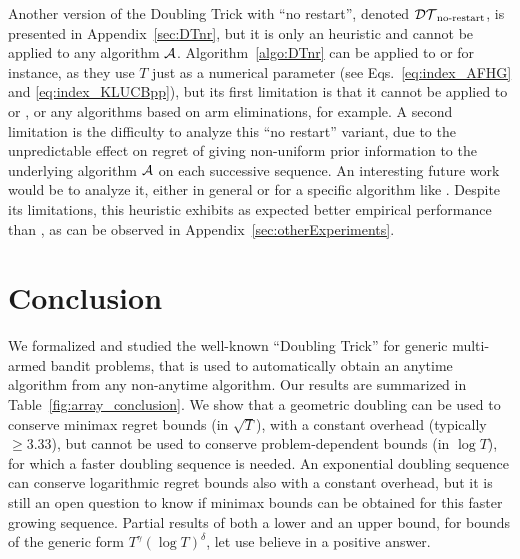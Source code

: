 \documentclass[12pt]{colt2018} %
\begin{document}


Another version of the Doubling Trick with ``no restart'', denoted $\mathcal{DT}_{\text{no-restart}}$, is presented in Appendix~\ref{sec:DTnr}, but it is only an heuristic and cannot be applied to any algorithm $\mathcal{A}$.
Algorithm~\ref{algo:DTnr} can be applied to \KLUCBpp{} or \AFHG{} for instance, as they use $T$ just as a numerical parameter (see Eqs.~\ref{eq:index_AFHG} and \ref{eq:index_KLUCBpp}), but its first limitation is that it cannot be applied to \DMEDp{} \citep{Honda10} or \Exppp{} \citep{Seldin17}, or any algorithms based on arm eliminations, for example.
%
A second limitation is the difficulty to analyze this ``no restart'' variant,
due to the unpredictable effect on regret of giving non-uniform prior information to the underlying algorithm $\mathcal{A}$ on each successive sequence.
An interesting future work would be to analyze it, either in general or for a specific algorithm like \KLUCBpp.
%
Despite its limitations, this heuristic exhibits as expected better empirical performance than \DT, as can be observed in Appendix~\ref{sec:otherExperiments}.

\section{Conclusion}\label{sec:conclusion}


We formalized and studied the well-known ``Doubling Trick'' for generic multi-armed bandit problems, that is used to automatically obtain an anytime algorithm from any non-anytime algorithm. Our results are summarized in Table~\ref{fig:array_conclusion}. We show that a geometric doubling can be used to conserve minimax regret bounds (in $\sqrt{T}$), with a constant overhead (typically $\geq 3.33$),
but cannot be used to conserve problem-dependent bounds (in $\log T$),
for which a faster doubling sequence is needed.
An exponential doubling sequence can conserve logarithmic regret bounds also with a constant overhead,
but it is still an open question to know if minimax bounds can be obtained for this faster growing sequence.
%
Partial results of both a lower and an upper bound, for bounds of the generic form $T^{\gamma} (\log T)^{\delta}$, let use believe in a positive answer.
\end{document}
